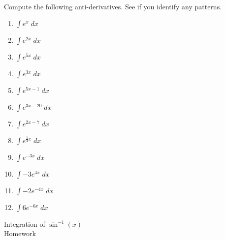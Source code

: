 \documentclass[12pt, letterpaper]{report}
\newcommand{\0}{\emptyset}
\theoremstyle{theorem}
\theoremstyle{definition}
\theoremstyle{definition}
\theoremstyle{definition}
\theoremstyle{definition}
\theoremstyle{theorem}
\theoremstyle{theorem}
\theoremstyle{remark}
\begin{document}
Compute the following anti-derivatives.  See if you identify any patterns.
\begin{multicols}{3}
\bfseries{\begin{Large}
	\begin{enumerate}
		\item $\displaystyle\int e^{x}\; dx$
		\vspace{3.5cm}
		\item $\displaystyle\int e^{2x}\; dx$
		\vspace{3.5cm}
		\item $\displaystyle\int e^{5x}\; dx$
		\vspace{3.5cm}
		\item $\displaystyle\int e^{3x}\; dx$
		\vspace{3.5cm}
		\item $\displaystyle\int e^{5x-1}\; dx$
		\vspace{3.5cm}
		\item $\displaystyle\int e^{3x-20}\; dx$
		\vspace{3.5cm}
		\item $\displaystyle\int e^{2x-7}\; dx$
		\vspace{3.5cm}
		\item $\displaystyle\int e^{\frac{1}{4}x}\; dx$
		\vspace{3.5cm}
		\item $\displaystyle\int e^{-3x}\; dx$
		\vspace{3.5cm}
		\item $\displaystyle\int -3e^{4x}\; dx$
		\vspace{3.5cm}
		\item $\displaystyle\int -2e^{-4x}\; dx$
		\vspace{3.5cm}
		\item $\displaystyle\int 6e^{-6x}\; dx$
		\vspace{3.5cm}
		
	\end{enumerate}
\end{Large}}

\end{multicols}


%

\newpage
\begin{center}
\Large Integration of $\sin^{-1}(x)$\\ Homework
\end{center}
\end{document}
